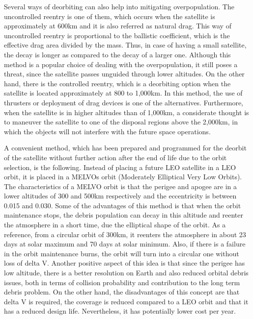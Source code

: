 Several ways of deorbiting can also help into mitigating overpopulation. The uncontrolled reentry is one of them, which occurs when the satellite is approximately at 600km and it is also referred as natural drag. This way of uncontrolled reentry is proportional to the ballistic coefficient, which is the effective drag area divided by the mass. Thus, in case of having a small satellite, the decay is longer as compared to the decay of a larger one. Although this method is a popular choice of dealing with the overpopulation, it still poses a threat, since the satellite passes unguided through lower altitudes. On the other hand, there is the controlled reentry, which is a deorbiting option when the satellite is located approximately at 800 to 1,000km. In this method, the use of thrusters or deployment of drag devices is one of the alternatives. Furthermore, when the satellite is in higher altitudes than of 1,000km, a considerate thought is to maneuver the satellite to one of the disposal regions above the 2,000km, in which the objects will not interfere with the future space operations. \cite{NASA}


\bigskip
A convenient method, which has been prepared and programmed for the deorbit of the satellite without further action after the end of life due to the orbit selection, is the following. Instead of placing a future LEO satellite in a LEO orbit, it is placed in a MELVOs orbit (Moderately Elliptical Very Low Orbits). The characteristics of a MELVO orbit is that the perigee and apogee are in a lower altitudes of 300 and 500km respectively and the eccentricity is between 0.015 and 0.030. Some of the advantages of this method is that when the orbit maintenance stops, the debris population can decay in this altitude and reenter the atmosphere in a short time, due the elliptical shape of the orbit. As a reference, from a circular orbit of 300km, it reenters the atmosphere in about 23 days at solar maximum and 70 days at solar minimum. Also, if there is a failure in the orbit maintenance burns, the orbit will turn into a circular one without loss of delta V. Another positive aspect of this idea is that since the perigee has low altitude, there is a better resolution on Earth and also reduced orbital debris issues, both in terms of collision probability and contribution to the long term debris problem. \cite{Kramer 2002} On the other hand, the disadvantages of this concept are that delta V is required, the coverage is reduced compared to a LEO orbit and that it has a reduced design life. Nevertheless, it has potentially lower cost per year.

